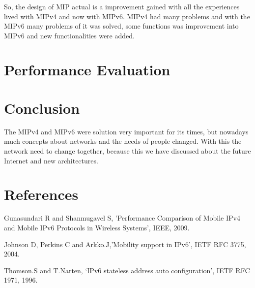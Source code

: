 \documentclass[12pt]{article}
\begin{document}
So, the design of MIP actual is a improvement gained with all the experiences lived with MIPv4 and now with MIPv6. MIPv4 had many problems and with the MIPv6 many problems of it was solved, some functions was improvement into MIPv6 and new functionalities were added.


\section{Performance Evaluation}


\section{Conclusion}

The MIPv4 and MIPv6 were solution very important for its times, but nowadays much concepts about networks and the needs of people changed. With this the network need to change together, because this we have discussed about the future Internet and new architectures.



\section{References}
Gunasundari R and Shanmugavel S, 'Performance Comparison of Mobile IPv4 and Mobile IPv6 Protocols in Wireless Systems', IEEE, 2009.

Johnson D, Perkins C and Arkko.J,’Mobility support in IPv6', IETF RFC 3775, 2004.

Thomson.S and T.Narten, ‘IPv6 stateless address auto configuration’, IETF  RFC 1971, 1996.




\end{document}
